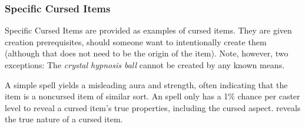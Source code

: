 \subsubsection{Specific Cursed Items}
Specific Cursed Items are provided as examples of cursed items. They are given creation prerequisites, should someone want to intentionally create them (although that does not need to be the origin of the item). Note, however, two exceptions: The \emph{crystal hypnosis ball} cannot be created by any known means.

A simple  spell yields a misleading aura and strength, often indicating that the item is a noncursed item of similar sort. An  spell only has a 1\% chance per caster level to reveal a cursed item's true properties, including the cursed aspect.  reveals the true nature of a cursed item.

